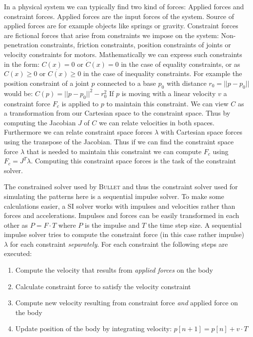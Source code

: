 \documentclass[english,ngerman]{KITreprt}
\newcommand{\name}[1]{\textsc{#1}}
\begin{document}
In a physical system we can typically find two kind of forces: Applied
forces and constraint forces. Applied forces are the input forces of the
system. Source of applied forces are for example objects like springs or
gravity. Constraint forces are fictional forces that arise from
constraints we impose on the system: Non-penetration constraints,
friction constraints, position constraints of joints or velocity
constraints for motors. Mathematically we can express such constraints
in the form: $C(x) = 0$ or $\dot{C}(x) = 0$ in the case of equality
constraints, or as $C(x) \geq 0$ or $\dot{C(x)} \geq 0$ in the case of
inequality constraints. For example the position constraint of a joint
$p$ connected to a base $p_0$ with distance $r_0 = ||p-p_0||$ would be:
$C(p) = || p - p_0 ||^2 - r_0^2$ If $p$ is moving with a linear velocity
$v$ a constraint force $F_c$ is applied to $p$ to maintain this
constraint. We can view $C$ as a transformation from our Cartesian space
to the constraint space. Thus by computing the Jacobian $J$ of $C$ we
can relate velocities in both spaces. Furthermore we can relate
constraint space forces $\lambda$ with Cartesian space forces using the
transpose of the Jacobian. Thus if we can find the constraint space
force $\lambda$ that is needed to maintain this constraint we can
compute $F_c$ using $F_c = J^T \lambda$. Computing this constraint space
forces is the task of the constraint solver.

The constrained solver used by \name{Bullet} and thus the constraint
solver used for simulating the patterns here is a sequential impulse
solver. To make some calculations easier, a SI solver works with
impulses and velocities rather than forces and accelerations. Impulses
and forces can be easily transformed in each other as $P = F \cdot T$
where $P$ is the impulse and $T$ the time step size. A sequential
impulse solver tries to compute the constraint force (in this case
rather impulse) $\lambda$ for each constraint \emph{separately}. For
each constraint the following steps are executed:

\begin{enumerate}
\def\labelenumi{\arabic{enumi}.}
\itemsep1pt\parskip0pt
\item
  Compute the velocity that results from \emph{applied forces} on the
  body
\item
  Calculate constraint force to satisfy the velocity constraint
\item
  Compute new velocity resulting from constraint force \emph{and}
  applied force on the body
\item
  Update position of the body by integrating velocity:
  $p[n+1] = p[n] + v \cdot T$
\end{enumerate}
\end{document}
